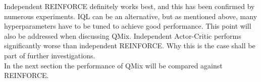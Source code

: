 Independent REINFORCE definitely works best, and this has been confirmed by numerous experiments. IQL can be an alternative, but as mentioned above, many hyperparameters have to be tuned to achieve good performance. This point will also be addressed when discussing QMix. Independent Actor-Critic performs significantly worse than independent REINFORCE. Why this is the case shall be part of further investigations.\\
In the next section the performance of QMix will be compared against REINFORCE.

